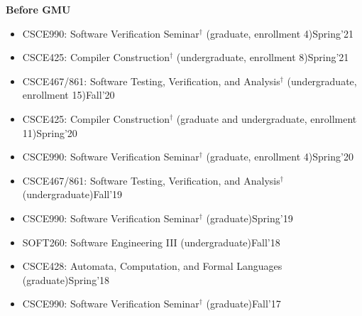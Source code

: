 \documentclass[11pt]{article}
\newcommand{\beforegmu}{\textbf{Before GMU}}
\begin{document}
\vspace{0.1in}
\beforegmu{}
\vspace{0.1in}

\begin{itemize}
    \item CSCE990: Software Verification Seminar$^{\dagger}$ (graduate, enrollment 4)\hfill Spring'21
    \item CSCE425: Compiler Construction$^{\dagger}$ (undergraduate, enrollment 8)\hfill Spring'21
    \item CSCE467/861: Software Testing, Verification, and Analysis$^{\dagger}$ (undergraduate, enrollment 15)\hfill Fall'20
    \item CSCE425: Compiler Construction$^{\dagger}$ (graduate and undergraduate, enrollment 11)\hfill Spring'20
    \item CSCE990: Software Verification Seminar$^{\dagger}$ (graduate, enrollment 4)\hfill Spring'20
    \item CSCE467/861: Software Testing, Verification, and Analysis$^{\dagger}$ (undergraduate)\hfill Fall'19
    \item CSCE990: Software Verification Seminar$^{\dagger}$ (graduate)\hfill Spring'19
    \item SOFT260: Software Engineering III (undergraduate)\hfill Fall'18
    \item CSCE428: Automata, Computation, and Formal Languages (graduate)\hfill Spring'18
    \item CSCE990: Software Verification Seminar$^{\dagger}$ (graduate)\hfill Fall'17

\end{itemize}
\end{document}
